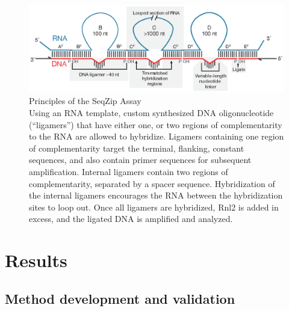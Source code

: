 	\begin{figure} %
		\centering 
		\includegraphics{Figures/SeqZipPaper/Roy2014Fig1.eps}
		\caption[Principles of the SeqZip Assay]
		{
			Principles of the SeqZip Assay\\[0.25cm]
			Using an RNA template, custom synthesized DNA oligonucleotide (``ligamers'') that have either one, or two regions of complementarity to the RNA are allowed to hybridize. Ligamers containing one region of complementarity target the terminal, flanking, constant sequences, and also contain primer sequences for subsequent amplification. Internal ligamers contain two regions of complementarity, separated by a spacer sequence. Hybridization of the internal ligamers encourages the RNA between the hybridization sites to loop out. Once all ligamers are hybridized, Rnl2 is added in excess, and the ligated DNA is amplified and analyzed.
			}
		\label{SeqZipPaper:fig:Roy2014 F1}
		\end{figure}

\section{Results}
	\label{SeqZipPaper:sec:Results}

	\subsection{Method development and validation}
		\label{SeqZipPaper:subsec: Method Development and Validation}

